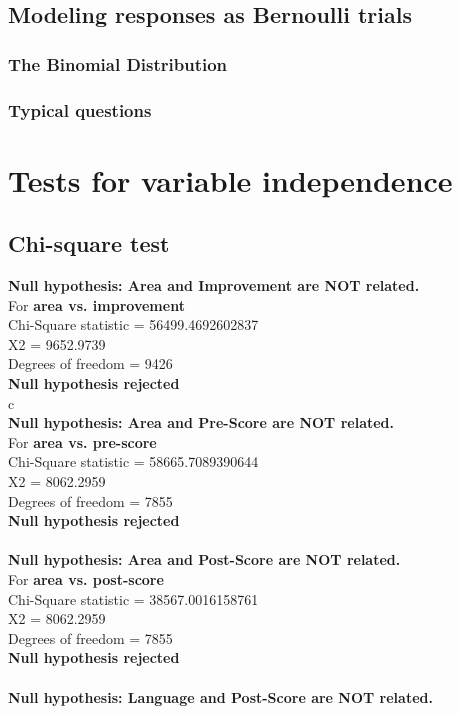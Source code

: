 \documentclass[10pt]{article}
\begin{document}
\subsection{Modeling responses as Bernoulli trials}
\subsubsection{The Binomial Distribution}
\subsubsection{Typical questions}

\section{Tests for variable independence}
\newpage
\subsection{Chi-square test}
\textbf{Null hypothesis: Area and Improvement are NOT related.} \\
 For \textbf{area vs. improvement}\\
 Chi-Square statistic = 56499.4692602837\\
 X2 = 9652.9739\\
 Degrees of freedom = 9426\\
 \textbf{Null hypothesis rejected}\\c
\\
\textbf{Null hypothesis: Area and Pre-Score are NOT related.}\\
 For \textbf{area vs. pre-score}\\
 Chi-Square statistic = 58665.7089390644\\
 X2 = 8062.2959\\
 Degrees of freedom = 7855\\
 \textbf{Null hypothesis rejected}\\
\\
\textbf{Null hypothesis: Area and Post-Score are NOT related.}\\
 For \textbf{area vs. post-score}\\
 Chi-Square statistic = 38567.0016158761\\
 X2 = 8062.2959\\
 Degrees of freedom = 7855\\
 \textbf{Null hypothesis rejected}\\
\\
\textbf{Null hypothesis: Language and Post-Score are NOT related.}\\
\end{document}
